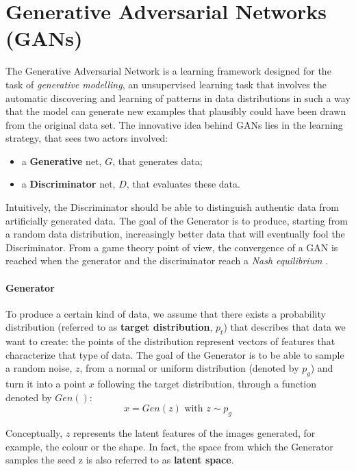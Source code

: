 \documentclass[12pt,a4paper]{book}
\theoremstyle{definition}
\begin{document}
	\section{Generative Adversarial Networks (GANs)}
	The Generative Adversarial Network \cite{Goodfellow2014} is a learning framework designed for the task of \textit{generative modelling}, an unsupervised learning task that involves the automatic discovering and learning of patterns in data distributions in such a way that the model can generate new examples that plausibly could have been drawn from the original data set. The innovative idea behind GANs lies in the learning strategy, that sees two actors involved:
	\begin{itemize}
		\item a \textbf{Generative} net, $G$, that generates data;
		\item a \textbf{Discriminator} net, $D$, that evaluates these data.
	\end{itemize}
	Intuitively, the Discriminator should be able to distinguish authentic data from artificially generated data. The goal of the Generator is to produce, starting from a random data distribution, increasingly better data that will eventually fool the Discriminator. From a game theory point of view, the convergence of a GAN is reached when the generator and the discriminator reach a \textit{Nash equilibrium} \cite{Ratliff2013}.
	\paragraph{Generator}
	To produce a certain kind of data, we assume that there exists a probability distribution (referred to as \textbf{target distribution}, $p_t$) that describes that data we want to create: the points of the distribution represent vectors of features that characterize that type of data. The goal of the Generator is to be able to sample a random noise, $z$, from a normal or uniform distribution (denoted by $p_g$) and turn it into a point $x$  following the target distribution, through a function denoted by $Gen()$:
	\[
	x = Gen(z) \text{ with } z \sim p_g
	\]
	
	Conceptually, $z$ represents the latent features of the images generated, for example, the colour or the shape. In fact, the space from which the Generator samples the seed z is also referred to as \textbf{latent space}.
\end{document}
